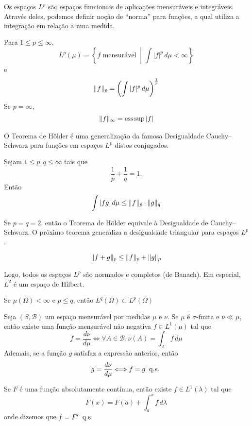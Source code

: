 Os espaços $L^p$ são espaços funcionais de aplicações mensuráveis e integráveis.
Através deles, podemos definir noção de ``norma'' para funções, a qual utiliza
a integração em relação a uma medida.

\begin{def:lp}
Para $1 \le p \le \infty$,
\[
	L^p(\mu) = \left\{f \text{ mensurável}\, \middle|\, \int |f|^p\, d\mu < \infty\right\}
\]
e
\[
	\lVert f\rVert_{p} = \left(\int |f|^p\, d\mu\right)^{\frac{1}{p}}
\]
Se $p = \infty$,
\[
	\lVert f\rVert_\infty = \mathrm{ess}\sup |f|
\]
\end{def:lp}

O Teorema de Hölder é uma generalização da famosa Desigualdade Cauchy--Schwarz para funções
em espaços $L^p$ distos conjugados.

\begin{thm:holder}[de Hölder]
Sejam $1 \le p, q \le \infty$ tais que
\[
	\frac{1}{p} + \frac{1}{q} = 1.
\]
Então
\[
	\int |fg|\, d\mu \le \lVert f\rVert_p \cdot \lVert g\rVert_q
\]
\end{thm:holder}

Se $p = q = 2$, então o Teorema de Hölder equivale à Desigualdade de Cauchy--Schwarz.
O próximo teorema generaliza a desigualdade triangular para espaços $L^p$.

\begin{thm:minkowski}
\[
	\lVert f+g\rVert_p \le \lVert f\rVert_p + \lVert g\rVert_p
\]
\end{thm:minkowski}

Logo, todos os espaços $L^p$ são normados e completos (de Banach).
Em especial, $L^2$ é um espaço de Hilbert.

\begin{thm:consq holder}
Se $\mu(\Omega) < \infty$ e $p \le q$, então $L^q(\Omega) \subset L^p(\Omega)$
\end{thm:consq holder}

\begin{thm:radon nikodym}
\label{thm:radon nikodym}
Seja $(S, \mathcal{B})$ um espaço mensurável por medidas $\mu$ e $\nu$.
Se $\mu$ é $\sigma$-finita e $\nu \ll \mu$, então existe uma função mensurável não
negativa $f \in L^1(\mu)$ tal que
\[
	f = \frac{d\nu}{d\mu} \Longleftrightarrow \forall A \in \mathcal{B}, \nu(A) = \int_A f\, d\mu
\]
Ademais, se a função $g$ satisfaz a expressão anterior, então
\[
	g = \frac{d\nu}{d\mu} \Longleftrightarrow f = g \;\;\mathrm{q.s.}\;
\]
\end{thm:radon nikodym}

\begin{thm:radon nikodym2}
\label{thm:radon nikodym2}
Se $F$ é uma função absolutamente contínua, então existe $f \in L^1(\lambda)$ tal que
\[
	F(x) = F(a) + \int_a^x f\, d\lambda
\]
onde dizemos que $f = F' \;\;\mathrm{q.s.}\;$
\end{thm:radon nikodym2}

